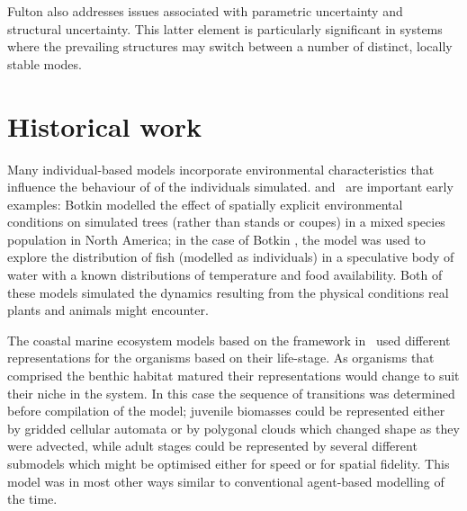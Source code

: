 Fulton also addresses issues associated with parametric uncertainty
and structural uncertainty.  This latter element is particularly
significant in systems where the prevailing structures may switch
between a number of distinct, locally stable modes.


\section{Historical work}

Many individual-based models incorporate environmental characteristics
that influence the behaviour of of the individuals
simulated.  and~\citet{deangelis1978model} are
important early examples: Botkin \etal modelled the effect of
spatially explicit environmental conditions on simulated trees (rather
than stands or coupes) in a mixed species population in
North America; in the case of Botkin \etal, the model was used to
explore the distribution of fish (modelled as individuals) in a
speculative body of water with a known distributions of temperature
and food availability. Both of these models simulated the 
dynamics resulting from the physical conditions real plants and
animals might encounter. 

The coastal marine ecosystem models based on the \InVitro framework
in~\cite{gray2006nws} used different representations for the organisms
based on their life-stage. As organisms that comprised the benthic
habitat matured their representations would change to suit their niche
in the system.  In this case the sequence of transitions was
determined before compilation of the model; juvenile biomasses could
be represented either by gridded cellular automata or by polygonal
clouds which changed shape as they were advected, while adult stages
could be represented by several different submodels which might be
optimised either for speed or for spatial fidelity.  This model was in
most other ways similar to conventional agent-based modelling of the
time.


